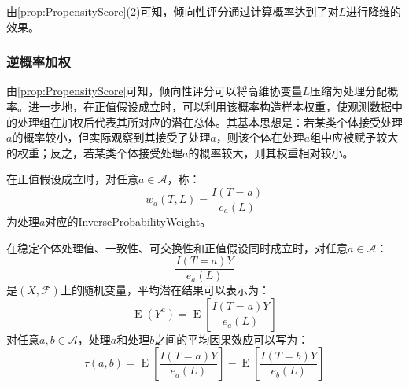 \begin{note}
	由\cref{prop:PropensityScore}(2)可知，倾向性评分通过计算概率达到了对$L$进行降维的效果。
\end{note}
\subsubsection{逆概率加权}
由\cref{prop:PropensityScore}可知，倾向性评分可以将高维协变量$L$压缩为处理分配概率。进一步地，在正值假设成立时，可以利用该概率构造样本权重，使观测数据中的处理组在加权后代表其所对应的潜在总体。其基本思想是：若某类个体接受处理$a$的概率较小，但实际观察到其接受了处理$a$，则该个体在处理$a$组中应被赋予较大的权重；反之，若某类个体接受处理$a$的概率较大，则其权重相对较小。
\begin{definition}
	在正值假设成立时，对任意$a\in\mathcal{A}$，称：
	\begin{equation*}
		w_a(T,L)=\frac{I(T=a)}{e_a(L)}
	\end{equation*}
	为处理$a$对应的\gls{InverseProbabilityWeight}。
\end{definition}
\begin{theorem}\label{theo:IPWIdentification}
	在稳定个体处理值、一致性、可交换性和正值假设同时成立时，对任意$a\in\mathcal{A}$：
	\begin{equation*}
		\frac{I(T=a)Y}{e_a(L)}
	\end{equation*}
	是$(X,\mathscr{F})$上的随机变量，平均潜在结果可以表示为：
	\begin{equation*}
		\operatorname{E}(Y^a)=\operatorname{E}\left[\frac{I(T=a)Y}{e_a(L)}\right]
	\end{equation*}
	对任意$a,b\in\mathcal{A}$，处理$a$和处理$b$之间的平均因果效应可以写为：
	\begin{equation*}
		\tau(a,b)=\operatorname{E}\left[\frac{I(T=a)Y}{e_a(L)}\right]-\operatorname{E}\left[\frac{I(T=b)Y}{e_b(L)}\right]
	\end{equation*}
\end{theorem}
